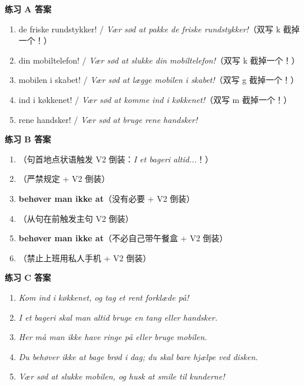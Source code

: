 \begin{answerbox}
\textbf{练习 A 答案}
\begin{enumerate}
  \item {} de friske rundstykker! / \textit{Vær sød at pakke de friske rundstykker!}（双写 k 截掉一个！）
  \item {} din mobiltelefon! / \textit{Vær sød at slukke din mobiltelefon!}（双写 k 截掉一个！）
  \item {} mobilen i skabet! / \textit{Vær sød at lægge mobilen i skabet!}（双写 g 截掉一个！）
  \item {} ind i køkkenet! / \textit{Vær sød at komme ind i køkkenet!}（双写 m 截掉一个！）
  \item {} rene handsker! / \textit{Vær sød at bruge rene handsker!}
\end{enumerate}

\textbf{练习 B 答案}
\begin{enumerate}
  \item {}（句首地点状语触发 V2 倒装：\textit{I et bageri  altid...}！）
  \item {}（严禁规定 + V2 倒装）
  \item \textbf{\color{NCDTeal}behøver man ikke at}（没有必要 + V2 倒装）
  \item {}（从句在前触发主句 V2 倒装）
  \item \textbf{\color{NCDTeal}behøver man ikke at}（不必自己带午餐盒 + V2 倒装）
  \item {}（禁止上班用私人手机 + V2 倒装）
\end{enumerate}

\textbf{练习 C 答案}
\begin{enumerate}
  \item \textit{Kom ind i køkkenet, og tag et rent forklæde på!}
  \item \textit{I et bageri skal man altid bruge en tang eller handsker.}
  \item \textit{Her må man ikke have ringe på eller bruge mobilen.}
  \item \textit{Du behøver ikke at bage brød i dag; du skal bare hjælpe ved disken.}
  \item \textit{Vær sød at slukke mobilen, og husk at smile til kunderne!}
\end{enumerate}


\end{answerbox}
